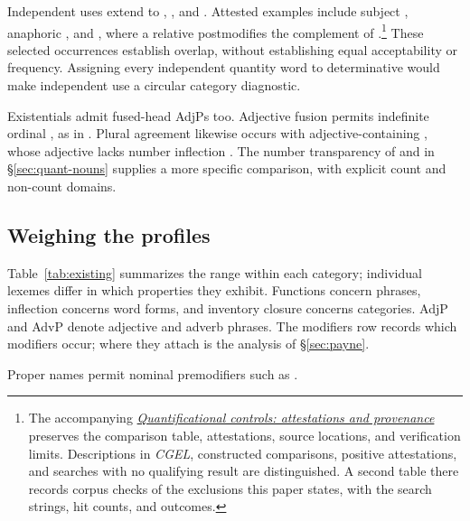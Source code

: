 \documentclass[12pt]{article}
\begin{document}
Independent uses extend to , , and . Attested examples include subject , anaphoric , and , where a relative postmodifies the complement of .\footnote{The accompanying \href{run:quantifier-controls.pdf}{\textit{Quantificational controls: attestations and provenance}} preserves the comparison table, attestations, source locations, and verification limits. Descriptions in \textit{CGEL}, constructed comparisons, positive attestations, and searches with no qualifying result are distinguished. A second table there records corpus checks of the exclusions this paper states, with the search strings, hit counts, and outcomes.} These selected occurrences establish overlap, without establishing equal acceptability or frequency. Assigning every independent quantity word to determinative would make independent use a circular category diagnostic.

Existentials admit fused-head AdjPs too. Adjective fusion permits indefinite ordinal  \citep[416]{huddleston2002}, as in . Plural agreement likewise occurs with adjective-containing , whose adjective lacks number inflection \citep[418]{huddleston2002}. The number transparency of  and  in §\ref{sec:quant-nouns} supplies a more specific comparison, with explicit count and non-count domains.

\subsection{Weighing the profiles}\label{sec:membership}

Table~\ref{tab:existing} summarizes the range within each category; individual lexemes differ in which properties they exhibit. Functions concern phrases, inflection concerns word forms, and inventory closure concerns categories. AdjP and AdvP denote adjective and adverb phrases. The modifiers row records which modifiers occur; where they attach is the analysis of §\ref{sec:payne}.

Proper names permit nominal premodifiers such as  \citep[520]{huddleston2002}.
\end{document}
